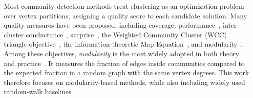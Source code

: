 \documentclass[11pt,a4paper]{article}
\begin{document}
Most community detection methods treat clustering as an optimization problem over vertex partitions, assigning a quality score to each candidate solution. Many quality measures have been proposed, including coverage, performance~\cite{Gaertler2005}, inter-cluster conductance~\cite{kannan2004clusterings}, surprise~\cite{arnau2004iterative}, the Weighted Community Cluster (WCC) triangle objective~\cite{wcc2012,scd2014}, the information-theoretic Map Equation~\cite{infomap2008,infoflow2019,neuromap2024}, and modularity~\cite{girvan2002,Newman2006}. Among these objectives, \emph{modularity} is the most widely adopted in both theory and practice~\cite{dimacschallengegraphpartandcluster,Li2024}. It measures the fraction of edges inside communities compared to the expected fraction in a random graph with the same vertex degrees. This work therefore focuses on modularity-based methods, while also including widely used random-walk baselines.
\end{document}
